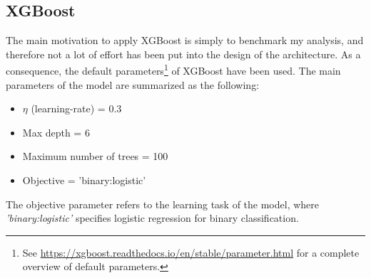 \subsection*{XGBoost}\label{subsec:XGBoost}
The main motivation to apply XGBoost is simply to benchmark my analysis, and therefore not a lot of effort has been put into the design of the 
architecture. As a consequence, the default parameters\footnote{See \href{https://xgboost.readthedocs.io/en/stable/parameter.html}
{https://xgboost.readthedocs.io/en/stable/parameter.html}
for a complete overview of default parameters.} of XGBoost have been used. The main parameters of the model are summarized as the following:
\begin{itemize}
    \item $\eta$ (learning-rate) = 0.3
    \item Max depth = 6
    \item Maximum number of trees = 100
    \item Objective = 'binary:logistic'
\end{itemize}
The objective parameter refers to the learning task of the model, where \emph{'binary:logistic'} specifies logistic regression for binary classification.


